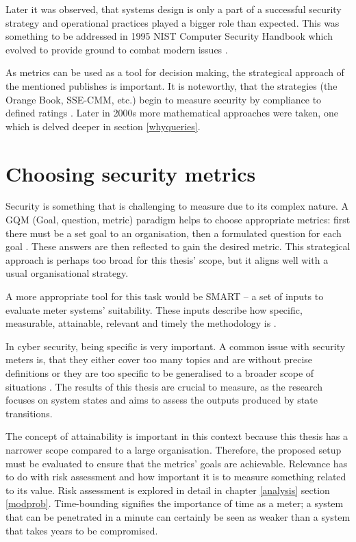 Later it was observed, that systems design is only a part of a
successful security strategy and operational practices played a
bigger role than expected. This was something to be addressed in 1995 NIST
Computer Security Handbook which evolved to provide ground to
combat modern issues \cite{bayuk2013measuring}.

As metrics can be used as a tool for decision making, the strategical
approach of the mentioned publishes is important. It is noteworthy, that
the strategies (the Orange Book, SSE-CMM, etc.) begin to measure
security by compliance to defined ratings \cite{bayuk2013measuring}. Later in 2000s more
mathematical approaches were taken, one which is delved deeper in
section \ref{whyqueries}. 

\section{Choosing security metrics} \label{choosingsecmet}

Security is something that is challenging to measure due to its
complex nature. A GQM (Goal, question, metric) paradigm helps to
choose appropriate metrics: first there must be a set goal to an
organisation, then a formulated question for each goal \cite{papazov2019cybersecurity}. These answers
are then reflected to gain the desired metric. This strategical
approach is perhaps too broad for this thesis' scope, but it aligns well
with a usual organisational strategy. 

A more appropriate tool for this task would be SMART – a set of inputs
to evaluate meter systems' suitability. These inputs describe how
specific, measurable, attainable, relevant and timely the methodology
is \cite{payne2006guide}.

In cyber security, being specific is very important. A common issue
with security meters is, that they either cover too many topics and
are without precise definitions or they are too specific to be
generalised to a broader scope of situations
\cite{wang2005information}. The results of this thesis are crucial to
measure, as the research focuses on system states and aims to assess
the outputs produced by state transitions.

The concept of attainability is important in this context because this
thesis has a narrower scope compared to a large
organisation. Therefore, the proposed setup must be evaluated to
ensure that the metrics' goals are achievable. Relevance has to do
with risk assessment and how important it is to measure something related
to its value. Risk assessment is explored in detail in chapter
\ref{analysis} section \ref{modprob}. Time-bounding signifies the
importance of time as a meter; a system that can be penetrated in a
minute can certainly be seen as weaker than a system that takes years
to be compromised.

